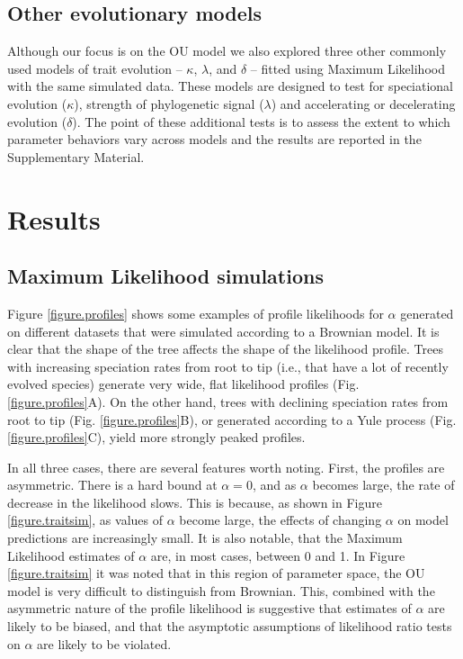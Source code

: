 \documentclass[a4paper,12pt]{article}
\begin{document}
  \subsection{Other evolutionary models}
    Although our focus is on the OU model we also explored three other commonly used models of trait evolution -- $\kappa$, $\lambda$, and $\delta$ \citep{Pagel:1997aa,Pagel:1999aa} -- fitted using Maximum Likelihood with the same simulated data. 
    These models are designed to test for speciational evolution ($\kappa$), strength of phylogenetic signal ($\lambda$) and accelerating or decelerating evolution ($\delta$). 
    The point of these additional tests is to assess the extent to which parameter behaviors vary across models and the results are reported in the Supplementary Material. 

\section{Results}
  \subsection{Maximum Likelihood simulations}
  \label{section:sims.results}
    
    Figure \ref{figure.profiles} shows some examples of profile likelihoods for $\alpha$ generated on different datasets that were simulated according to a Brownian model. It is clear that the shape of the tree affects the shape of the likelihood profile. Trees with increasing speciation rates from root to tip (i.e., that have a lot of recently evolved species) generate very wide, flat likelihood profiles (Fig. \ref{figure.profiles}A). On the other hand, trees with declining speciation rates from root to tip (Fig. \ref{figure.profiles}B), or generated according to a Yule process (Fig. \ref{figure.profiles}C), yield more strongly peaked profiles. 


In all three cases, there are several features worth noting. First, the profiles are asymmetric. There is a hard bound at $\alpha = 0$, and as $\alpha$ becomes large, the rate of decrease in the likelihood slows. This is because, as shown in Figure \ref{figure.traitsim}, as values of $\alpha$ become large, the effects of changing $\alpha$ on model predictions are increasingly small. It is also notable, that the Maximum Likelihood estimates of $\alpha$ are, in most cases, between 0 and 1. In Figure \ref{figure.traitsim} it was noted that in this region of parameter space, the OU model is very difficult to distinguish from Brownian. This, combined with the asymmetric nature of the profile likelihood is suggestive that estimates of $\alpha$ are likely to be biased, and that the asymptotic assumptions of likelihood ratio tests on $\alpha$ are likely to be violated.
\end{document}

